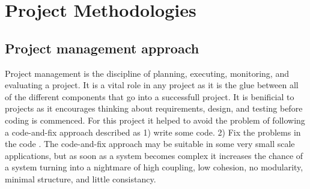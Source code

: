 
\chapter{Project Methodologies}\label{C:m}

\section{Project management approach}
Project management is the discipline of planning, executing, monitoring, and evaluating a project. It is a vital role in any project as it is the glue between all of the different components that go into a successfull project. It is benificial to projects as it encourages thinking about requirements, design, and testing before coding is commenced. For this project it helped to avoid the problem of following a code-and-fix approach described  as 1) write some code. 2) Fix the problems in the code \cite{boehm}. The code-and-fix approach may be suitable in some very small scale applications, but as soon as a system becomes complex it increases the chance of a system turning into a nightmare of high coupling, low cohesion, no modularity, minimal structure, and little consistancy. 
\\\\

